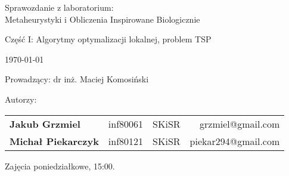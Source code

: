 \thispagestyle{empty} %

\begin{center}
{\large{Sprawozdanie z laboratorium:\\
Metaheurystyki i Obliczenia Inspirowane Biologicznie}}

\vspace{3ex}

Część I: Algorytmy optymalizacji lokalnej, problem TSP

\vspace{3ex}
{\footnotesize\today}

\end{center}


\vspace{10ex}

Prowadzący: dr inż. Maciej Komosiński

\vspace{5ex}

Autorzy:
\begin{tabular}{lllr}
\textbf{Jakub Grzmiel} & inf80061 & SKiSR & grzmiel@gmail.com \\
\textbf{Michał Piekarczyk} & inf80121 & SKiSR & piekar294@gmail.com \\
\end{tabular}

\vspace{5ex}

Zajęcia poniedziałkowe, 15:00.


\newpage

